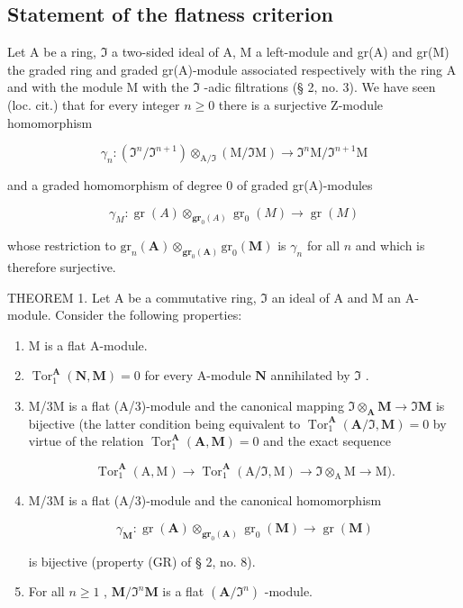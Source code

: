\subsection{Statement of the flatness criterion}

Let A be a ring, \(\mathfrak{I}\) a two-sided ideal of A, M a left-module and gr(A) and gr(M) the graded ring and graded gr(A)-module associated respectively with the ring A and with the module M with the \(\mathfrak{I}\) -adic filtrations (§ 2, no. 3). We have seen (loc. cit.) that for every integer \(n \geqslant 0\) there is a surjective Z-module homomorphism

\[
\gamma_ {n} \colon (\mathfrak {I} ^ {n} / \mathfrak {I} ^ {n + 1}) \otimes_ {\mathrm{A} / \mathfrak {I}} (\mathrm{M} / \mathfrak {I} \mathrm{M}) \rightarrow \mathfrak {I} ^ {n} \mathrm{M} / \mathfrak {I} ^ {n + 1} \mathrm{M}
\]

and a graded homomorphism of degree 0 of graded gr(A)-modules

\[
\gamma_ {M} \colon \operatorname{gr} (A) \otimes_ {\mathbf {g r} _ {0} (A)} \operatorname{gr} _ {0} (M) \to \operatorname{gr} (M)
\]

whose restriction to \(\mathrm{gr}_n(\mathbf{A})\otimes_{\mathbf{gr}_0(\mathbf{A})}\mathrm{gr}_0(\mathbf{M})\) is \(\gamma_{n}\) for all \(n\) and which is therefore surjective.

THEOREM 1. Let A be a commutative ring, \(\Im\) an ideal of A and M an A-module. Consider the following properties:

\begin{enumerate}
\def\labelenumi{(\roman{enumi})}
\item
  M is a flat A-module.
\item
  \(\operatorname{Tor}_1^{\mathbf{A}}(\mathbf{N},\mathbf{M}) = 0\) for every A-module \(\mathbf{N}\) annihilated by \(\Im\) .
\item
  M/3M is a flat (A/3)-module and the canonical mapping \(\Im \otimes_{\mathbf{A}} \mathbf{M} \to \Im \mathbf{M}\) is bijective (the latter condition being equivalent to \(\operatorname{Tor}_{1}^{\mathbf{A}}(\mathbf{A}/\Im, \mathbf{M}) = 0\) by virtue of the relation \(\operatorname{Tor}_{1}^{\mathbf{A}}(\mathbf{A}, \mathbf{M}) = 0\) and the exact sequence

\[
\operatorname{Tor} _ {1} ^ {\mathbf {A}} (\mathrm{A}, \mathrm{M}) \rightarrow \operatorname{Tor} _ {1} ^ {\mathbf {A}} (\mathrm{A} / \Im , \mathrm{M}) \rightarrow \Im \otimes_ {\mathrm{A}} \mathrm{M} \rightarrow \mathrm{M}).
\]

\item
  M/3M is a flat (A/3)-module and the canonical homomorphism

\[
\gamma_ {\mathbf {M}} \colon \operatorname{gr} (\mathbf {A}) \otimes_ {\mathbf {g r} _ {0} (\mathbf {A})} \operatorname{gr} _ {0} (\mathbf {M}) \rightarrow \operatorname{gr} (\mathbf {M})
\]

is bijective (property (GR) of § 2, no. 8).

\item
  For all \(n \geqslant 1\) , \(\mathbf{M} / \Im^n\mathbf{M}\) is a flat \((\mathbf{A} / \Im^n)\) -module.
\end{enumerate}

